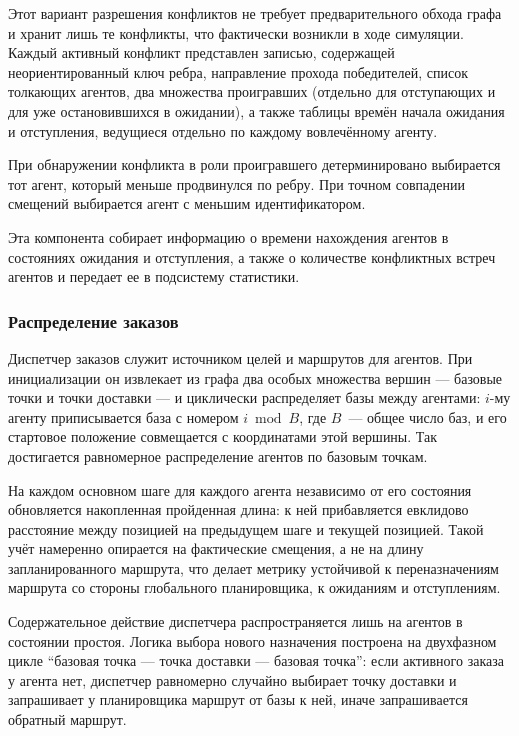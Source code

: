 Этот вариант разрешения конфликтов не требует предварительного обхода графа и хранит лишь те конфликты, 
что фактически возникли в ходе симуляции. Каждый активный конфликт представлен записью, содержащей 
неориентированный ключ ребра, направление прохода победителей, список толкающих агентов, два множества 
проигравших (отдельно для отступающих и для уже остановившихся в ожидании), а также таблицы времён 
начала ожидания и отступления, ведущиеся отдельно по каждому вовлечённому агенту.

При обнаружении конфликта в роли проигравшего детерминировано выбирается тот агент, который меньше 
продвинулся по ребру. При точном совпадении смещений выбирается агент с меньшим идентификатором.

Эта компонента собирает информацию о времени нахождения агентов в состояниях ожидания и отступления, 
а также о количестве конфликтных встреч агентов и передает ее в подсистему статистики.

\subsubsection{Распределение заказов}

Диспетчер заказов служит источником целей и маршрутов для агентов. 
При инициализации он извлекает из графа два
особых множества вершин --- базовые точки и точки доставки --- и циклически распределяет базы
между агентами: $i$-му агенту приписывается база с номером $i \bmod B$, где $B$~--- общее число
баз, и его стартовое положение совмещается с координатами этой вершины. Так достигается
равномерное распределение агентов по базовым точкам.

На каждом основном шаге для каждого агента независимо от его состояния обновляется накопленная
пройденная длина: к ней прибавляется евклидово расстояние между позицией на предыдущем шаге и
текущей позицией. Такой учёт намеренно опирается на фактические смещения, а не на длину
запланированного маршрута, что делает метрику устойчивой к переназначениям маршрута со стороны
глобального планировщика, к ожиданиям и отступлениям.

Содержательное действие диспетчера распространяется лишь на агентов в состоянии простоя. 
Логика выбора нового назначения построена на двухфазном цикле \enquote{базовая точка --- точка
доставки --- базовая точка}: если активного заказа у агента нет, диспетчер равномерно случайно выбирает
точку доставки и запрашивает у планировщика маршрут от базы к ней, иначе запрашивается обратный
маршрут.

